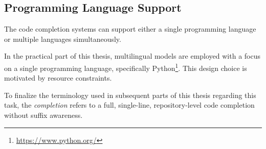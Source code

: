 \subsection{Programming Language Support}

The code completion systems can support either a single programming language or multiple languages simultaneously.

In the practical part of this thesis, multilingual models are employed with a focus on a single programming language, specifically Python\footnote{\url{https://www.python.org/}}. This design choice is motivated by resource constraints.
\medskip

To finalize the terminology used in subsequent parts of this thesis regarding this task, the \textit{completion} refers to a full, single-line, repository-level code completion without suffix awareness.
